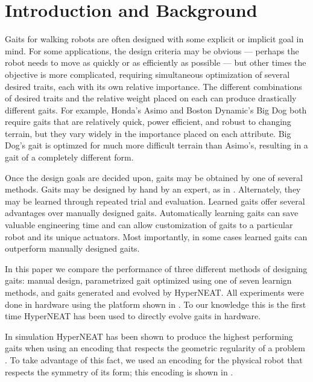 \section{Introduction and Background}



Gaits for walking robots are often designed with some explicit or
implicit goal in mind.  For some applications, the design criteria may
be obvious --- perhaps the robot needs to move as quickly or as
efficiently as possible --- but other times the objective is more complicated,
requiring simultaneous optimization of several desired traits, each
with its own relative importance.  The different combinations of desired traits and the relative weight placed on each can produce drastically different gaits.    For example, Honda's Asimo
\cite{_asmio} and Boston Dynamic's Big Dog \cite{_bigdog} both require
gaits that are relatively quick, power efficient, and robust to
changing terrain, but they vary widely in the importance placed
on each attribute.  Big Dog's gait is optimzed for much more difficult terrain than Asimo's, resulting in a gait of a completely different form.

Once the design goals are decided upon, gaits may be obtained by one of several methods.  Gaits may be designed by hand by an expert, as in \cite{_asmio, _bigdog}.  Alternately, they may be learned through repeated trial and evaluation.  Learned gaits offer several advantages over manually designed gaits.  Automatically learning gaits can save valuable engineering time and can allow customization of gaits to a particular robot and its unique actuators.  Most importantly, in some cases learned gaits can outperform manually designed gaits.

In this paper we compare the performance of three different methods of designing gaits: manual design, parametrized gait optimized using one of seven learnign methods, and gaits generated and evolved by HyperNEAT.  All experiments were done in hardware using the platform shown in . To our knowledge this is the first time HyperNEAT has been used to directly evolve gaits in hardware.

In simulation HyperNEAT has been shown to produce the highest performing gaits when using an encoding that respects the geometric regularity of a problem \cite{jeffSomething}. To take advantage of this fact, we used an encoding for the physical robot that respects the symmetry of its form; this encoding is shown in .

